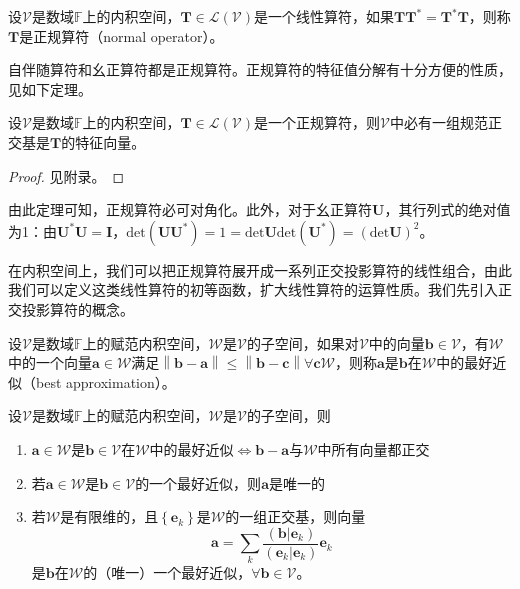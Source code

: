 \documentclass[main.tex]{subfiles}
\begin{document}
\begin{definition}[正规算符]
设$\mathcal{V}$是数域$\mathbb{F}$上的内积空间，$\mathbf{T}\in\mathcal{L}\left(\mathcal{V}\right)$是一个线性算符，如果$\mathbf{TT}^*=\mathbf{T}^*\mathbf{T}$，则称$\mathbf{T}$是正规算符（normal operator）。
\end{definition}

自伴随算符和幺正算符都是正规算符。正规算符的特征值分解有十分方便的性质，见如下定理。

\begin{theorem}
设$\mathcal{V}$是数域$\mathbb{F}$上的内积空间，$\mathbf{T}\in\mathcal{L}\left(\mathcal{V}\right)$是一个正规算符，则$\mathcal{V}$中必有一组规范正交基是$\mathbf{T}$的特征向量。
\end{theorem}
\begin{proof}
见附录。
\end{proof}

由此定理可知，正规算符必可对角化。此外，对于幺正算符$\mathbf{U}$，其行列式的绝对值为1：由$\mathbf{U}^*\mathbf{U}=\mathbf{I}$，$\mathrm{det}\left(\mathbf{UU}^*\right)=1=\mathrm{det}\mathbf{U}\mathrm{det}\left(\mathbf{U}^*\right)=\left(\mathrm{det}\mathbf{U}\right)^2$。

在内积空间上，我们可以把正规算符展开成一系列正交投影算符的线性组合，由此我们可以定义这类线性算符的初等函数，扩大线性算符的运算性质。我们先引入正交投影算符的概念。

\begin{definition}[最好近似]
设$\mathcal{V}$是数域$\mathbb{F}$上的赋范内积空间，$\mathcal{W}$是$\mathcal{V}$的子空间，如果对$\mathcal{V}$中的向量$\mathbf{b}\in\mathcal{V}$，有$\mathcal{W}$中的一个向量$\mathbf{a}\in\mathcal{W}$满足$\left\|\mathbf{b}-\mathbf{a}\right\|\leq\left\|\mathbf{b}-\mathbf{c}\right\|\forall\mathbf{c}\mathcal{W}$，则称$\mathbf{a}$是$\mathbf{b}$在$\mathcal{W}$中的最好近似（best approximation）。
\end{definition}

\begin{theorem}
设$\mathcal{V}$是数域$\mathbb{F}$上的赋范内积空间，$\mathcal{W}$是$\mathcal{V}$的子空间，则
\begin{enumerate}
    \item $\mathbf{a}\in\mathcal{W}$是$\mathbf{b}\in\mathcal{V}$在$\mathcal{W}$中的最好近似$\Leftrightarrow\mathbf{b}-\mathbf{a}$与$\mathcal{W}$中所有向量都正交
    \item 若$\mathbf{a}\in\mathcal{W}$是$\mathbf{b}\in\mathcal{V}$的一个最好近似，则$\mathbf{a}$是唯一的
    \item 若$\mathcal{W}$是有限维的，且$\left\{\mathbf{e}_k\right\}$是$\mathcal{W}$的一组正交基，则向量
    \[\mathbf{a}=\sum_k\frac{\left(\mathbf{b}|\mathbf{e}_k\right)}{\left(\mathbf{e}_k|\mathbf{e}_k\right)}\mathbf{e}_k\]
    是$\mathbf{b}$在$\mathcal{W}$的（唯一）一个最好近似，$\forall\mathbf{b}\in\mathcal{V}$。
\end{enumerate}
\end{theorem}
\end{document}
